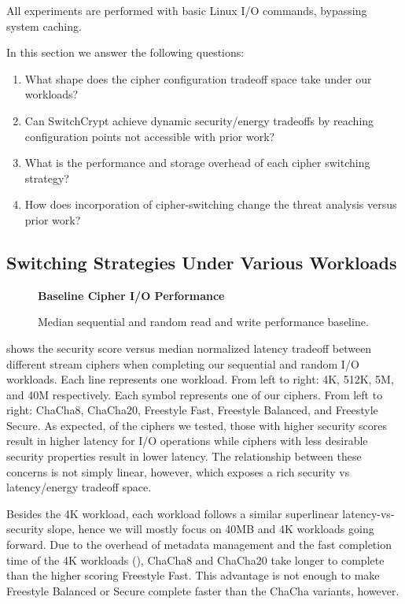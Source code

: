 All experiments are performed with basic Linux I/O commands, bypassing system
caching.

In this section we answer the following questions:

\begin{enumerate}
 \item What shape does the cipher configuration tradeoff space take under
 our workloads?
 \item Can SwitchCrypt achieve dynamic security/energy tradeoffs by reaching
 configuration points not accessible with prior work?
 \item What is the performance and storage overhead of each cipher switching
 strategy?
 \item How does incorporation of cipher-switching change the threat analysis
 versus prior work?
\end{enumerate}

\subsection{Switching Strategies Under Various Workloads}

\begin{figure}[ht]
  \textbf{Baseline Cipher I/O Performance}\par\medskip
  {} \caption{Median sequential and random
  read and write performance baseline.}
 \label{fig:tradeoff-no-ratios}
\end{figure}

 shows the security score versus median normalized
latency tradeoff between different stream ciphers when completing our sequential
and random I/O workloads.  Each line represents one workload. From left to right:
4K, 512K, 5M, and 40M respectively. Each symbol represents one of our ciphers.
From left to right: ChaCha8, ChaCha20, Freestyle Fast, Freestyle Balanced, and
Freestyle Secure. As expected, of the ciphers we tested, those with higher
security scores result in higher latency for I/O operations while ciphers with
less desirable security properties result in lower latency. The relationship
between these concerns is not simply linear, however, which exposes a rich
security vs latency/energy tradeoff space.

Besides the 4K workload, each workload follows a similar superlinear
latency-vs-security slope, hence we will mostly focus on 40MB and 4K workloads
going forward. Due to the overhead of metadata management and the fast
completion time of the 4K workloads (), ChaCha8 and ChaCha20 take longer to complete than the higher scoring
Freestyle Fast. This advantage is not enough to make Freestyle Balanced or
Secure complete faster than the ChaCha variants, however.

